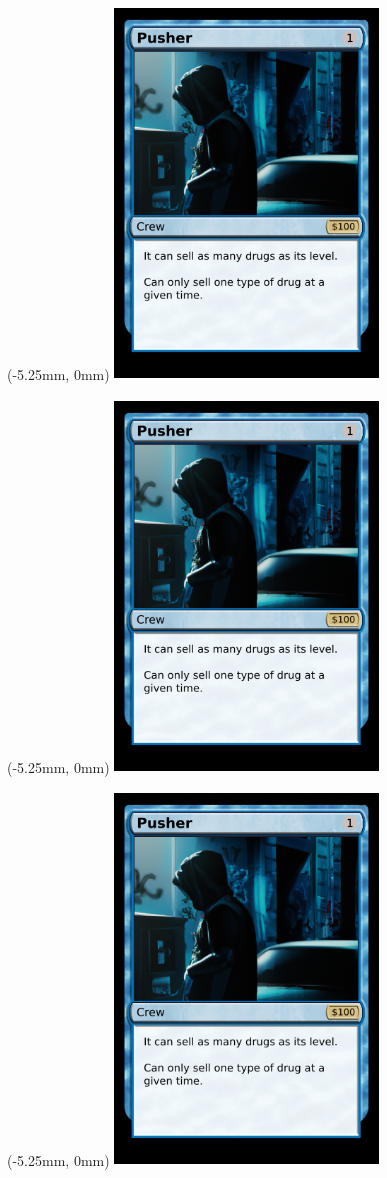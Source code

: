 \documentclass{article}
\begin{document}
	\begin{textblock*}{0mm}(-5.25mm, 0mm)
        \includegraphics[width=70mm, height=99mm]{../png/crew/pusher/pusher1.png}
    \end{textblock*}

	\begin{textblock*}{0mm}(-5.25mm, 0mm)
        \includegraphics[width=70mm, height=99mm]{../png/crew/pusher/pusher1.png}
    \end{textblock*}

	\begin{textblock*}{0mm}(-5.25mm, 0mm)
        \includegraphics[width=70mm, height=99mm]{../png/crew/pusher/pusher1.png}
    \end{textblock*}
\end{document}
